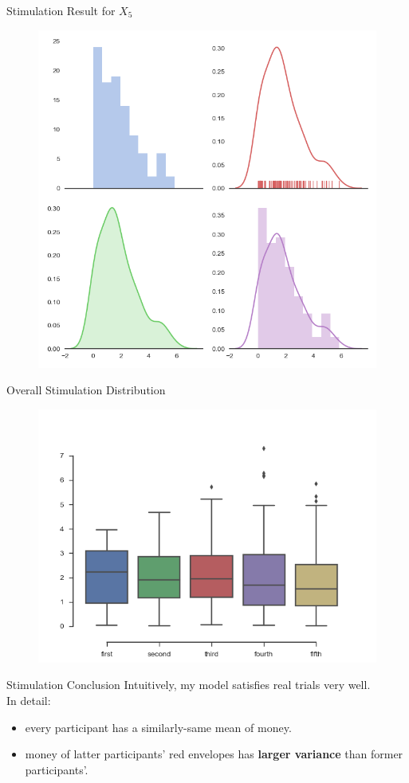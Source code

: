 \documentclass[12pt]{beamer}
\begin{document}
\begin{frame}{Stimulation Result for \(X_5\)}
	\begin{figure}[!ht]
		\centering
		\includegraphics[width=0.7\columnwidth,height=0.6\linewidth]{fig/output_5.png}
	\end{figure}
\end{frame}

\begin{frame}{Overall Stimulation Distribution}
	\begin{figure}[!ht]
		\centering
		\includegraphics[width=0.7\columnwidth,height=0.6\linewidth]{fig/output.png}
	\end{figure}
\end{frame}

\begin{frame}{Stimulation Conclusion}
	Intuitively, my model satisfies real trials very well.
	\\
	In detail:
	\begin{itemize}
		\item every participant has a similarly-same mean of money.
		\item money of latter participants' red envelopes has \textbf{larger variance} than former participants'.
	\end{itemize}
\end{frame}
\end{document}
